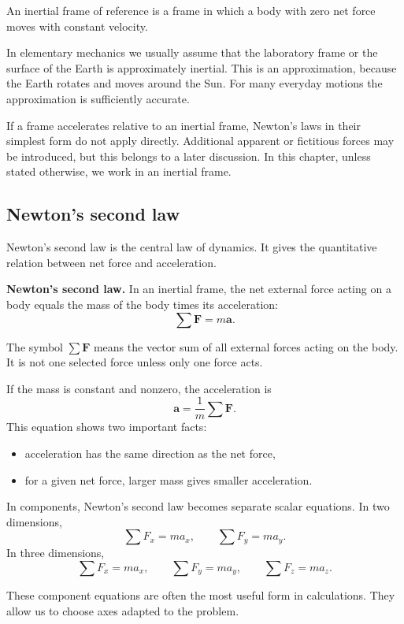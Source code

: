 \begin{definitionbox}
An inertial frame of reference is a frame in which a body with zero net force moves with constant velocity.
\end{definitionbox}

In elementary mechanics we usually assume that the laboratory frame or the surface of the Earth is approximately inertial. This is an approximation, because the Earth rotates and moves around the Sun. For many everyday motions the approximation is sufficiently accurate.

If a frame accelerates relative to an inertial frame, Newton's laws in their simplest form do not apply directly. Additional apparent or fictitious forces may be introduced, but this belongs to a later discussion. In this chapter, unless stated otherwise, we work in an inertial frame.

\subsection{Newton's second law}

Newton's second law is the central law of dynamics. It gives the quantitative relation between net force and acceleration.

\begin{theorembox}
\textbf{Newton's second law.} In an inertial frame, the net external force acting on a body equals the mass of the body times its acceleration:
\[
\sum \mathbf{F}=m\mathbf{a}.
\]
\end{theorembox}

The symbol \(\sum \mathbf{F}\) means the vector sum of all external forces acting on the body. It is not one selected force unless only one force acts.

If the mass is constant and nonzero, the acceleration is
\[
\mathbf{a}=\frac{1}{m}\sum \mathbf{F}.
\]
This equation shows two important facts:
\begin{itemize}
\item acceleration has the same direction as the net force,
\item for a given net force, larger mass gives smaller acceleration.
\end{itemize}

In components, Newton's second law becomes separate scalar equations. In two dimensions,
\[
\sum F_x=ma_x,
\qquad
\sum F_y=ma_y.
\]
In three dimensions,
\[
\sum F_x=ma_x,
\qquad
\sum F_y=ma_y,
\qquad
\sum F_z=ma_z.
\]

These component equations are often the most useful form in calculations. They allow us to choose axes adapted to the problem.

